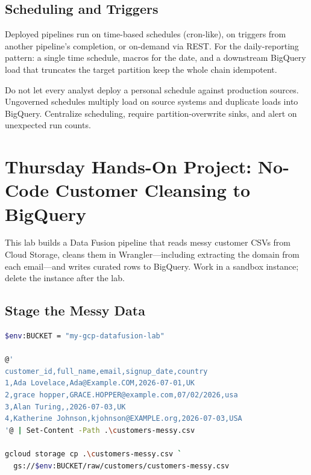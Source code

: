 \subsection{Scheduling and Triggers}
Deployed pipelines run on time-based schedules (cron-like), on triggers from another pipeline's completion, or on-demand via REST. For the daily-reporting pattern: a single time schedule, macros for the date, and a downstream BigQuery load that truncates the target partition keep the whole chain idempotent.

\begin{pitfall}
Do not let every analyst deploy a personal schedule against production sources. Ungoverned schedules multiply load on source systems and duplicate loads into BigQuery. Centralize scheduling, require partition-overwrite sinks, and alert on unexpected run counts.
\end{pitfall}

\section{Thursday Hands-On Project: No-Code Customer Cleansing to BigQuery}
This lab builds a Data Fusion pipeline that reads messy customer CSVs from Cloud Storage, cleans them in Wrangler---including extracting the domain from each email---and writes curated rows to BigQuery. Work in a sandbox instance; delete the instance after the lab.

\subsection{Stage the Messy Data}
\begin{lstlisting}[language=bash,caption={Staging a deliberately messy customer CSV.}]
$env:BUCKET = "my-gcp-datafusion-lab"

@'
customer_id,full_name,email,signup_date,country
1,Ada Lovelace,Ada@Example.COM,2026-07-01,UK
2,grace hopper,GRACE.HOPPER@example.com,07/02/2026,usa
3,Alan Turing,,2026-07-03,UK
4,Katherine Johnson,kjohnson@EXAMPLE.org,2026-07-03,USA
'@ | Set-Content -Path .\customers-messy.csv

gcloud storage cp .\customers-messy.csv `
  gs://$env:BUCKET/raw/customers/customers-messy.csv
\end{lstlisting}

